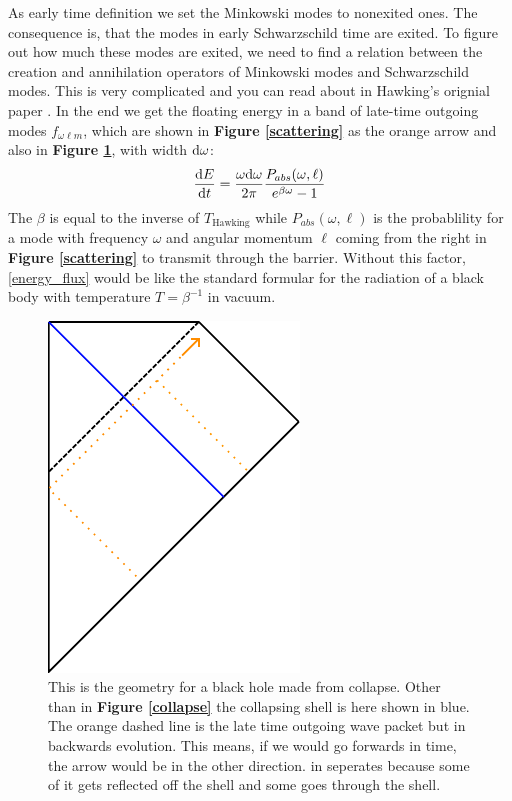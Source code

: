 	As early time definition we set the Minkowski modes to nonexited ones. The consequence is, that the modes in early Schwarzschild time are exited. 
	To figure out how much these modes are exited, we need to find a relation between the creation and annihilation operators of Minkowski modes and Schwarzschild modes. This is very complicated and you can read about in Hawking's orignial paper \cite{Hawking}. In the end we get the floating energy in a band of late-time outgoing modes $f_{\omega \ell m}$, which are shown in \textbf{Figure \ref{scattering}} as the orange arrow and also in \textbf{Figure \ref{collapse2}}, with width $\mathrm{d} \omega$: 
	\begin{align} \label{energy_flux}
		\frac{\mathrm{d} E}{\mathrm{d} t} = \frac{\omega \mathrm{d} \omega}{2\pi}
		\frac{P_{abs}(\omega,\ell)}{e^{\beta \omega}-1}
	\end{align} 
	The $\beta$ is equal to the inverse of $T_{\text{Hawking}}$ while $P_{abs}(\omega,\ell)$ is the probablility for a mode with frequency $\omega$ and angular momentum $\ell$ coming from the right in \textbf{Figure \ref{scattering}} to transmit through the barrier.
	Without this factor, \eqref{energy_flux} would be like the standard formular for the radiation of a black body with temperature $T = \beta^{-1}$ in vacuum. 
	\begin{figure}
		\begin{center}
			\includegraphics[scale=1]{collapse2}
			\caption{This is the geometry for a black hole made from collapse. Other than in \textbf{Figure \ref{collapse}} the collapsing shell is here shown in blue. The orange dashed line is the late time outgoing wave packet but in backwards evolution. This means, if we would go forwards in time, the arrow would be in the other direction. in seperates because some of it gets reflected off the shell and some goes through the shell.} \label{collapse2}
		\end{center}
	\end{figure}
	
